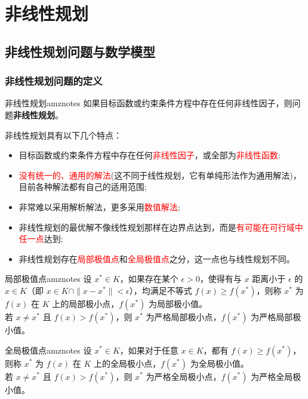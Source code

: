 \ifx\allfiles\undefined

	
	
\else
\fi
    \chapter{非线性规划}
    \section{非线性规划问题与数学模型}
    \subsection{非线性规划问题的定义}
    
\begin{dfnbox}{非线性规划}{amznotes}
    如果目标函数或约束条件方程中存在任何非线性因子，则问题\textbf{非线性规划}。
\end{dfnbox}
非线性规划具有以下几个特点：
\begin{itemize}
    \item 目标函数或约束条件方程中存在任何\textcolor{red}{非线性因子}，或全部为\textcolor{red}{非线性函数}:
    \item \textcolor{red}{没有统一的、通用的解法}(这不同于线性规划，它有单纯形法作为通用解法)，目前各种解法都有自己的适用范围;
    \item 非常难以采用解析解法，更多采用\textcolor{red}{数值解法};
    \item 非线性规划的最优解不像线性规划那样在边界点达到，而是\textcolor{red}{有可能在可行域中任一点}达到;
    \item 非线性规划存在\textcolor{red}{局部极值点}和\textcolor{red}{全局极值点}之分，这一点也与线性规划不同。
\end{itemize}
\begin{dfnbox}{局部极值点}{amznotes}
    设 $x^* \in K$，如果存在某个 $\epsilon > 0$，使得有与 $x$ 距离小于 $\epsilon$ 的 $x \in K$（即 $x \in K \cap \|x - x^*\| < \epsilon$），均满足不等式 $f(x) \geq f(x^*)$，则称 $x^*$ 为 $f(x)$ 在 $K$ 上的局部极小点，$f(x^*)$ 为局部极小值。\\
    若 $x \neq x^*$ 且 $f(x) > f(x^*)$，则 $x^*$ 为严格局部极小点，$f(x^*)$ 为严格局部极小值。
\end{dfnbox}
\begin{dfnbox}{全局极值点}{amznotes}
    设 $x^* \in K$，如果对于任意 $x \in K$，都有 $f(x) \geq f(x^*)$，则称 $x^*$ 为 $f(x)$ 在 $K$ 上的全局极小点，$f(x^*)$ 为全局极小值。\\
    若 $x \neq x^*$ 且 $f(x) > f(x^*)$，则 $x^*$ 为严格全局极小点，$f(x^*)$ 为严格全局极小值。
\end{dfnbox}
